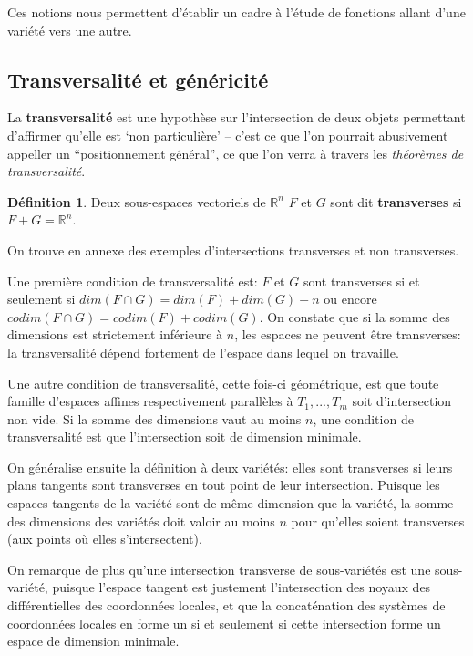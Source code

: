 \documentclass{article}
\newcommand{\R}{\mathbb{R}}
\theoremstyle{definition}
\newtheorem{defn}{Définition}
\begin{document}
Ces notions nous permettent d'établir un cadre à l'étude de fonctions allant d'une variété vers une autre.

\subsection{Transversalité et généricité}

La \textbf{transversalité} est une hypothèse sur l'intersection de deux objets permettant d'affirmer qu'elle est `non particulière' -- c'est ce que l'on pourrait abusivement appeller un ``positionnement général'', ce que l'on verra à travers les \textit{théorèmes de transversalité}.
\begin{defn}
	Deux sous-espaces vectoriels de $\R^n$ $F$ et $G$ sont dit \textbf{transverses} si $F+G=\R^n$.

\end{defn}

On trouve en annexe des exemples d'intersections transverses et non transverses.

Une première condition de transversalité est: $F$ et $G$ sont transverses si et seulement si $dim(F\cap G)=dim(F)+dim(G)-n$ ou encore $codim(F\cap G)=codim(F)+codim(G)$.
On constate que si la somme des dimensions est strictement inférieure à $n$, les espaces ne peuvent être transverses: la transversalité dépend fortement de l'espace dans lequel on travaille.

Une autre condition de transversalité, cette fois-ci géométrique, est que toute famille d'espaces affines respectivement parallèles à $T_1,...,T_m$ soit d'intersection non vide.
Si la somme des dimensions vaut au moins $n$, une condition de transversalité est que l'intersection soit de dimension minimale.

On généralise ensuite la définition à deux variétés: elles sont transverses si leurs plans tangents sont transverses en tout point de leur intersection.
Puisque les espaces tangents de la variété sont de même dimension que la variété, la somme des dimensions des variétés doit valoir au moins $n$ pour qu'elles soient transverses (aux points où elles s'intersectent).

On remarque de plus qu'une intersection transverse de sous-variétés est une sous-variété, puisque l'espace tangent est justement l'intersection des noyaux des différentielles des coordonnées locales, et que la concaténation des systèmes de coordonnées locales en forme un si et seulement si cette intersection forme un espace de dimension minimale.
\end{document}
